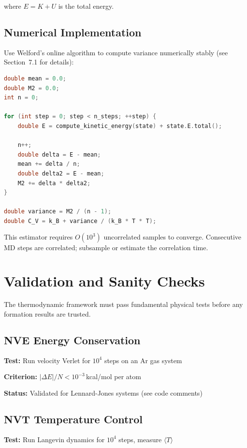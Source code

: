 \documentclass[11pt]{article}
\begin{document}
where $E = K + U$ is the total energy.

\subsection{Numerical Implementation}

Use Welford's online algorithm to compute variance numerically stably (see Section~7.1 for details):

\begin{lstlisting}[language=C++]
double mean = 0.0;
double M2 = 0.0;
int n = 0;

for (int step = 0; step < n_steps; ++step) {
    double E = compute_kinetic_energy(state) + state.E.total();
    
    n++;
    double delta = E - mean;
    mean += delta / n;
    double delta2 = E - mean;
    M2 += delta * delta2;
}

double variance = M2 / (n - 1);
double C_V = k_B + variance / (k_B * T * T);
\end{lstlisting}

This estimator requires $O(10^3)$ uncorrelated samples to converge. Consecutive MD steps are correlated; subsample or estimate the correlation time.

\section{Validation and Sanity Checks}

The thermodynamic framework must pass fundamental physical tests before any formation results are trusted.

\subsection{NVE Energy Conservation}

\textbf{Test:} Run velocity Verlet for $10^4$ steps on an Ar gas system

\textbf{Criterion:} $|\Delta E| / N < 10^{-3}$\,kcal/mol per atom

\textbf{Status:} Validated for Lennard-Jones systems (see code comments)

\subsection{NVT Temperature Control}

\textbf{Test:} Run Langevin dynamics for $10^4$ steps, measure $\langle T \rangle$
\end{document}
